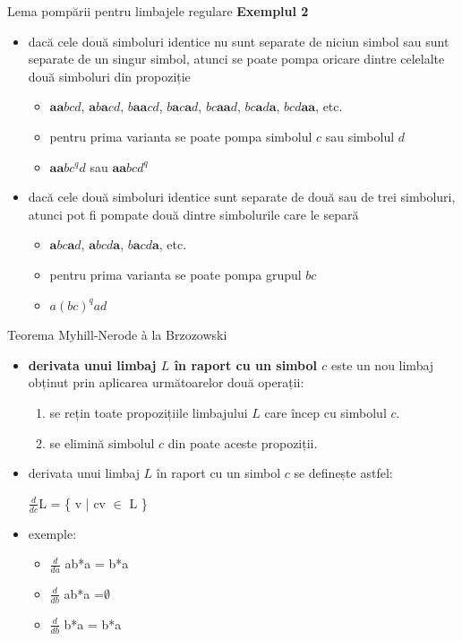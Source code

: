 \documentclass[pdf]{beamer}
\begin{document}
\begin{frame}{Lema pompării pentru limbajele regulare}
\textbf{Exemplul 2}
\begin{itemize}
\item
dacă cele două simboluri identice nu sunt separate de niciun simbol sau sunt separate de un singur simbol, atunci se poate pompa oricare dintre celelalte două simboluri din propoziție

\begin{itemize}
\item
$\textbf{aa}bcd$, $\textbf{a}b\textbf{a}cd$, $b\textbf{aa}cd$, $b\textbf{a}c\textbf{a}d$, $bc\textbf{aa}d$, $bc\textbf{a}d\textbf{a}$, $bcd\textbf{aa}$, etc.
\item
pentru prima varianta se poate pompa simbolul $c$ sau simbolul $d$
\item
$\textbf{aa}bc^q d$ sau $\textbf{aa}bcd^q$
\end{itemize}
\item
dacă cele două simboluri identice sunt separate de două sau de trei simboluri, atunci pot fi pompate două dintre simbolurile care le separă
\begin{itemize}
\item
$\textbf{a}bc\textbf{a}d$, $\textbf{a}bcd\textbf{a}$, $b\textbf{a}cd\textbf{a}$, etc.
\item
pentru prima varianta se poate pompa grupul $bc$
\item
$a(bc)^q ad$
\end{itemize}
\end{itemize}
\end{frame}



\begin{frame}{Teorema Myhill-Nerode à la Brzozowski}
\begin{itemize}
\item
\textbf{derivata unui limbaj $L$ în raport cu un simbol $c$} este un nou limbaj obținut prin aplicarea următoarelor două operații:

\begin{enumerate}
\item
se rețin toate propozițiile limbajului $L$ care încep cu simbolul $c$.
\item
se elimină simbolul $c$ din poate aceste propoziții.
\end{enumerate}

\item
derivata unui limbaj $L$ în raport cu un simbol $c$ se definește astfel:

$\frac{d}{ dc}$L = \{ v | cv $\in$ L \}

\item
exemple:
\begin{itemize}
\item
$\frac{d}{da}$ ab*a = b*a
\item
$\frac{d}{db}$ ab*a =$\emptyset$
\item
$\frac{d}{db}$ b*a = b*a
\end{itemize}
\end{itemize}
\end{frame}
\end{document}
